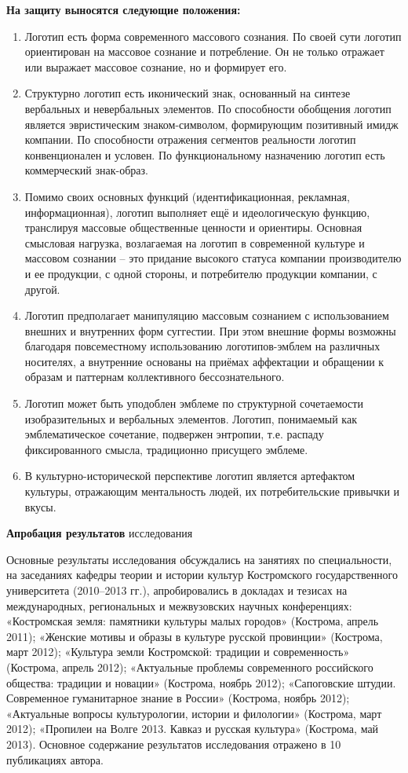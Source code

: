 \textbf{На защиту выносятся следующие положения:}
\begin{enumerate}
\item Логотип есть форма современного массового сознания. По своей сути логотип ориентирован на массовое сознание и потребление. Он не только отражает или выражает массовое сознание, но и формирует его. 
\item Структурно логотип есть иконический знак, основанный на синтезе вербальных и невербальных элементов. По способности обобщения логотип является эвристическим знаком-символом, формирующим позитивный имидж компании. По способности отражения сегментов реальности логотип конвенционален и условен. По функциональному назначению логотип есть коммерческий знак-образ.
\item Помимо своих основных функций (идентификационная, рекламная, информационная), логотип выполняет ещё и идеологическую функцию, транслируя массовые общественные ценности и ориентиры. Основная смысловая нагрузка, возлагаемая на логотип в современной культуре и массовом сознании – это придание высокого статуса компании производителю и ее продукции, с одной стороны, и потребителю продукции компании, с другой.
\item Логотип предполагает манипуляцию массовым сознанием с использованием внешних и внутренних форм суггестии. При этом внешние формы возможны благодаря повсеместному использованию логотипов-эмблем на различных носителях, а внутренние основаны на приёмах аффектации и обращении к образам и паттернам коллективного бессознательного.
\item Логотип может быть уподоблен эмблеме по структурной сочетаемости изобразительных и вербальных элементов. Логотип, понимаемый как эмблематическое сочетание, подвержен энтропии, т.е. распаду фиксированного смысла, традиционно присущего эмблеме. 
\item В культурно-исторической перспективе логотип является артефактом культуры, отражающим ментальность людей, их потребительские привычки и вкусы. 
\end{enumerate}

\textbf{Апробация результатов} исследования

Основные результаты исследования обсуждались на занятиях по специальности, на заседаниях кафедры теории и истории культур Костромского государственного университета (2010–2013 гг.), апробировались в докладах и тезисах на международных, региональных и межвузовских научных конференциях: «Костромская земля: памятники культуры малых городов» (Кострома, апрель 2011); «Женские мотивы и образы в культуре русской провинции» (Кострома, март 2012); «Культура земли Костромской: традиции и современность» (Кострома, апрель 2012); «Актуальные проблемы современного российского общества: традиции и новации» (Кострома, ноябрь 2012); «Сапоговские штудии. Современное гуманитарное знание в России» (Кострома, ноябрь 2012); «Актуальные вопросы культурологии, истории и филологии» (Кострома, март 2012); «Пропилеи на Волге 2013. Кавказ и русская культура» (Кострома, май 2013). Основное содержание результатов исследования отражено в 10 публикациях автора.

